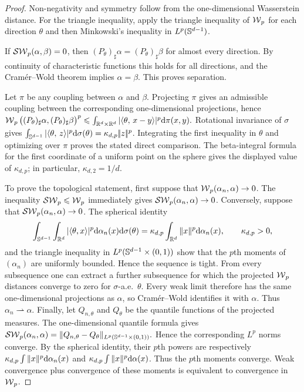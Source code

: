 \begin{proof}
Non-negativity and symmetry follow from the one-dimensional Wasserstein distance. For the triangle inequality, apply the triangle inequality of $\operatorname{\mathcal{W}}_p$ for each direction $\theta$ and then Minkowski's inequality in $L^p(\mathbb{S}^{d-1})$.

If $\operatorname{\mathcal{SW}}_p(\alpha,\beta)=0$, then $(P_\theta)_\sharp\alpha=(P_\theta)_\sharp\beta$ for almost every direction. By continuity of characteristic functions this holds for all directions, and the Cram\'er--Wold theorem implies $\alpha=\beta$. This proves separation.

Let $\pi$ be any coupling between $\alpha$ and $\beta$. Projecting $\pi$ gives an admissible coupling between the corresponding one-dimensional projections, hence
\(\operatorname{\mathcal{W}}_p\big((P_\theta)_\sharp\alpha,(P_\theta)_\sharp\beta\big)^p \leqslant \int_{\mathbb{R}^d\times\mathbb{R}^d}|\langle \theta,\,x-y\rangle|^p\mathrm{d}\pi(x,y).\)
Rotational invariance of $\sigma$ gives
$\int_{\mathbb{S}^{d-1}}|\langle \theta,\,z\rangle|^p\mathrm{d}\sigma(\theta) = \kappa_{d,p}|\!| z |\!|^p$.
Integrating the first inequality in $\theta$ and optimizing over $\pi$ proves the stated direct comparison. The beta-integral formula for the first coordinate of a uniform point on the sphere gives the displayed value of $\kappa_{d,p}$; in particular, $\kappa_{d,2}=1/d$.

To prove the topological statement, first suppose that $\operatorname{\mathcal{W}}_p(\alpha_n,\alpha)\to0$. The inequality $\operatorname{\mathcal{SW}}_p\leqslant\operatorname{\mathcal{W}}_p$ immediately gives $\operatorname{\mathcal{SW}}_p(\alpha_n,\alpha)\to0$. Conversely, suppose that $\operatorname{\mathcal{SW}}_p(\alpha_n,\alpha)\to0$. The spherical identity
\[
\int_{\mathbb{S}^{d-1}}\int_{\mathbb{R}^d}|\langle\theta,x\rangle|^p\mathrm{d}\alpha_n(x)\mathrm{d}\sigma(\theta)
=
\kappa_{d,p}\int_{\mathbb{R}^d}\|x\|^p\mathrm{d}\alpha_n(x),
\qquad
\kappa_{d,p}>0,
\]
and the triangle inequality in $L^p(\mathbb{S}^{d-1}\times(0,1))$ show that the $p$th moments of $(\alpha_n)$ are uniformly bounded. Hence the sequence is tight. From every subsequence one can extract a further subsequence for which the projected $\operatorname{\mathcal{W}}_p$ distances converge to zero for $\sigma$-a.e.\ $\theta$. Every weak limit therefore has the same one-dimensional projections as $\alpha$, so Cram\'er--Wold identifies it with $\alpha$. Thus $\alpha_n\rightharpoonup\alpha$. Finally, let $Q_{n,\theta}$ and $Q_\theta$ be the quantile functions of the projected measures. The one-dimensional quantile formula gives
\(\operatorname{\mathcal{SW}}_p(\alpha_n,\alpha) = \|Q_{n,\theta}-Q_\theta\|_{L^p(\mathbb{S}^{d-1}\times(0,1))}.\)
Hence the corresponding $L^p$ norms converge. By the spherical identity, their $p$th powers are respectively $\kappa_{d,p}\int\|x\|^p\mathrm{d}\alpha_n(x)$ and $\kappa_{d,p}\int\|x\|^p\mathrm{d}\alpha(x)$. Thus the $p$th moments converge. Weak convergence plus convergence of these moments is equivalent to convergence in $\operatorname{\mathcal{W}}_p$.


\end{proof}
